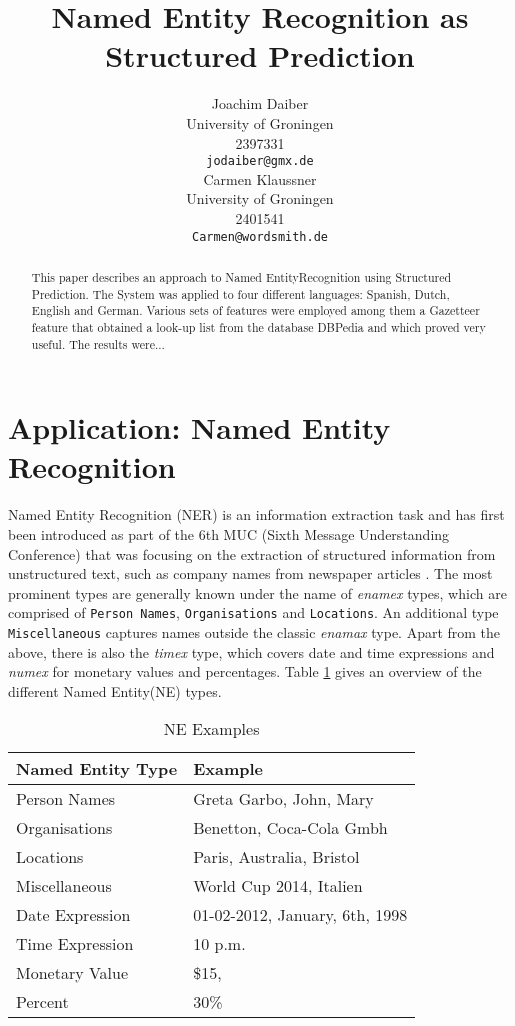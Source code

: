 \documentclass[11pt]{article}
\title{Named Entity Recognition as Structured Prediction}
\author{Joachim Daiber \\
  University of Groningen \\
  2397331\\
  {\tt jodaiber@gmx.de} \\\And
  Carmen Klaussner \\
  University of Groningen \\
  2401541\\
  {\tt Carmen@wordsmith.de} \\}
\date{}
\newcommand{\namedentity}{Named Entity}
\begin{document}
\maketitle

\begin{abstract}
This paper describes an approach to \namedentity Recognition using Structured Prediction. The System was applied to four different languages: Spanish, Dutch, English and
German. Various sets of features were employed among them a Gazetteer feature that obtained a look-up list from the database DBPedia and which proved very useful.
The results were...
\end{abstract}


\section{Application: Named Entity Recognition}

Named Entity Recognition (NER) is an information extraction task and has first been introduced as part of the 6th MUC (Sixth Message Understanding Conference)
that was focusing on the extraction of structured information from unstructured text, such as company names from newspaper articles \cite{nadeau2007survey}.
The most prominent types are generally known under the name of \emph{enamex} types, which are comprised of \texttt{Person Names}, 
\texttt{Organisations} and \texttt{Locations}. 
An additional type \texttt{Miscellaneous} captures names outside the classic \emph{enamax} type.
Apart from the above, there is also the \emph{timex} type, which covers date and time expressions and \emph{numex} for monetary values and percentages. 
Table \ref{table:NETypes} gives an overview of the different \namedentity (NE) types.

\begin{table}[h!]
\scriptsize
\begin{tabular}{| l | l |}
\hline
\bf Named Entity Type & \bf Example \\
\hline
Person Names & Greta Garbo, John, Mary \\
Organisations& Benetton, Coca-Cola Gmbh\\
Locations&  Paris, Australia, Bristol\\
Miscellaneous& World Cup 2014, Italien\\
 Date Expression& 01-02-2012, January, 6th, 1998 \\
Time Expression & 10 p.m.\\
Monetary Value &  \$15, \textsterling 100    \\
Percent &   30\% \\
\hline
\end{tabular}
\caption{NE Examples}
\label{table:NETypes}
\end{table}
\end{document}
